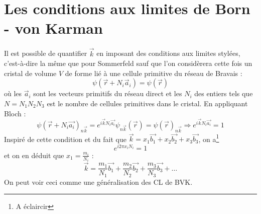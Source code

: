 	\section{Les conditions aux limites de Born - von Karman}
	Il est possible de quantifier $\vec{k}$ en imposant des conditions 
	aux limites stylées, c'est-à-dire la même que pour Sommerfeld sauf 
	que l'on considèrera cette fois un cristal de volume $V$ de forme 
	lié à une cellule primitive du réseau de Bravais :
	\begin{equation}
	\psi(\vec{r}+N_i\vec{a}_i) = \psi(\vec{r})
	\end{equation}
	où les $\vec a_i$ sont les vecteurs primitifs du réseau direct et 
	les $N_i$ des entiers tels que $N = N_1N_2N_3 $ est le nombre de 
	cellules primitives dans le cristal. En appliquant Bloch :
	\begin{equation}
	\displaystyle
	\psi(\vec{r}+ N_i\vec{a_i})_{n\vec k} = e^{i\vec{k}N_i\vec{a_i}}
	\psi_{n\vec k}(\vec{r})= \psi(\vec{r})_{n\vec k} \Longrightarrow 
	e^{i\vec{k}N_i\vec{a_i}} = 1
	\end{equation}
	Inspiré de cette condition et du fait que $\vec{k} = x_1\vec{b_1}
	+x_2\vec{b_2}+x_3\vec{b_3}$, on a\footnote{A éclaircir}
	\begin{equation}
	e^{i2\pi x_iN_i} = 1
	\end{equation}		
	 et on en déduit que $x_1=\frac{m_i}{N_i}$ :
	\begin{equation}
	\vec{k} = \frac{m_1}{N_1}\vec{b_1}+\frac{m_2}{N_2}\vec{b_2}+\frac{m_3}{
	N_3}\vec{b_3} + \dots
	\end{equation}
	On peut voir ceci comme une généralisation des CL de BVK.
	
	
